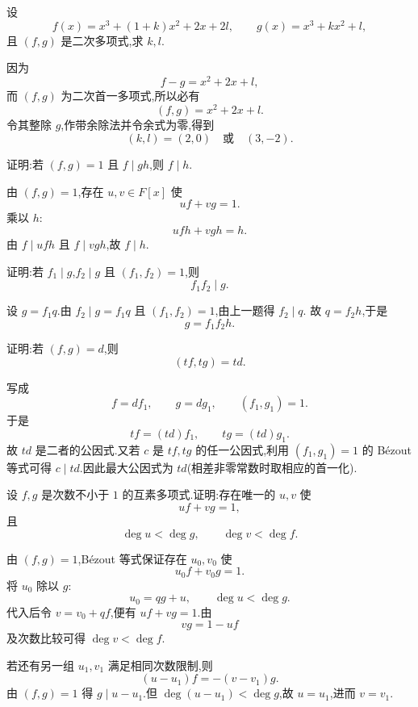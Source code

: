 \begin{example}
设
\[
  f(x)=x^3+(1+k)x^2+2x+2l,
  \qquad
  g(x)=x^3+kx^2+l,
\]
且 $(f,g)$ 是二次多项式,求 $k,l$.
\end{example}
\exampleblank

\begin{solution}
因为
\[
  f-g=x^2+2x+l,
\]
而 $(f,g)$ 为二次首一多项式,所以必有
\[
  (f,g)=x^2+2x+l.
\]
令其整除 $g$,作带余除法并令余式为零,得到
\[
  (k,l)=(2,0)\quad\text{或}\quad(3,-2).
\]
\end{solution}

\begin{example}[\markstar]
证明:若 $(f,g)=1$ 且 $f\mid gh$,则 $f\mid h$.
\end{example}
\exampleblank

\begin{solution}
由 $(f,g)=1$,存在 $u,v\in F[x]$ 使
\[
  uf+vg=1.
\]
乘以 $h$:
\[
  ufh+vgh=h.
\]
由 $f\mid ufh$ 且 $f\mid vgh$,故 $f\mid h$.
\end{solution}

\begin{example}[\markstar]
证明:若 $f_1\mid g$,$f_2\mid g$ 且 $(f_1,f_2)=1$,则
\[
  f_1f_2\mid g.
\]
\end{example}
\exampleblank

\begin{solution}
设 $g=f_1q$.由 $f_2\mid g=f_1q$ 且 $(f_1,f_2)=1$,由上一题得 $f_2\mid q$.
故 $q=f_2h$,于是
\[
  g=f_1f_2h.
\]
\end{solution}

\begin{example}[\markstar]
证明:若 $(f,g)=d$,则
\[
  (tf,tg)=td.
\]
\end{example}
\exampleblank

\begin{solution}
写成
\[
  f=df_1,\qquad g=dg_1,
  \qquad (f_1,g_1)=1.
\]
于是
\[
  tf=(td)f_1,\qquad tg=(td)g_1.
\]
故 $td$ 是二者的公因式.又若 $c$ 是 $tf,tg$ 的任一公因式,利用
$(f_1,g_1)=1$ 的 Bézout 等式可得 $c\mid td$.因此最大公因式为 $td$(相差非零常数时取相应的首一化).
\end{solution}

\begin{example}
设 $f,g$ 是次数不小于 $1$ 的互素多项式.证明:存在唯一的 $u,v$ 使
\[
  uf+vg=1,
\]
且
\[
  \deg u<\deg g,
  \qquad
  \deg v<\deg f.
\]
\end{example}
\exampleblank

\begin{solution}
由 $(f,g)=1$,Bézout 等式保证存在 $u_0,v_0$ 使
\[
  u_0f+v_0g=1.
\]
将 $u_0$ 除以 $g$:
\[
  u_0=qg+u,
  \qquad
  \deg u<\deg g.
\]
代入后令 $v=v_0+qf$,便有 $uf+vg=1$.由
\[
  vg=1-uf
\]
及次数比较可得 $\deg v<\deg f$.

若还有另一组 $u_1,v_1$ 满足相同次数限制,则
\[
  (u-u_1)f=-(v-v_1)g.
\]
由 $(f,g)=1$ 得 $g\mid u-u_1$.但 $\deg(u-u_1)<\deg g$,故 $u=u_1$,进而 $v=v_1$.
\end{solution}

